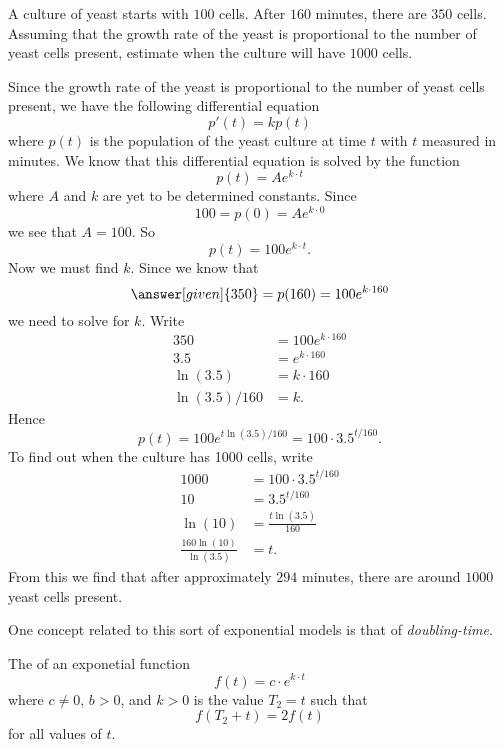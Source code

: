 \documentclass{ximera}
\begin{document}
\begin{example}
A culture of yeast starts with $100$ cells. After $160$ minutes, there
are $350$ cells. Assuming that the growth rate of the yeast is
proportional to the number of yeast cells present, estimate when the
culture will have $1000$ cells.

\begin{explanation}
Since the growth rate of the yeast is proportional to the number of
yeast cells present, we have the following differential equation
\[
p'(t) = k p(t)
\]
where $p(t)$ is the population of the yeast culture at time $t$ with
$t$ measured in minutes. We know that this differential equation is
solved by the function
\[
p(t) = A e^{k\cdot t}
\]
where $A$ and $k$ are yet to be determined constants. Since
\[
100 = p(0) = Ae^{k\cdot 0}
\]
we see that $A = 100$. So 
\[
p(t) = 100 e^{k\cdot t}.
\]
Now we must find $k$. Since we know that 
\[
\answer[given]{350} = p(160) = 100e^{k\cdot 160}
\]
we need to solve for $k$. Write
\begin{align*}
350 &= 100 e^{k\cdot 160}\\
3.5 &= e^{k\cdot 160}\\
\ln(3.5) &= k\cdot 160\\
\ln(3.5)/160 &= k. 
\end{align*}
Hence
\[
p(t) = 100 e^{t\ln(3.5)/160} = 100 \cdot 3.5^{t/160}.
\]
To find out when the culture has 1000 cells, write
\begin{align*}
1000 &= 100 \cdot 3.5^{t/160}\\
10 &= 3.5^{t/160}\\
\ln(10) &= \frac{t\ln(3.5)}{160}\\
\frac{160\ln(10)}{\ln(3.5)} &= t.
\end{align*}
From this we find that after approximately $294$ minutes, there are
around $1000$ yeast cells present.
\end{explanation}
\end{example}

One concept related to this sort of exponential models is that of \textit{doubling-time}.

\begin{definition}
  The  of an exponetial function
  \[
  f(t) = c\cdot e^{k\cdot t}
  \]
  where $c\ne 0$, $b>0$, and $k>0$ is the value $T_2 =t$ such that
  \[
  f(T_2+t) = 2 f(t)
  \]
  for all values of $t$.
\end{definition}
\end{document}

